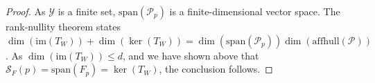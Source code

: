 \documentclass[anon,12pt]{colt2021} %
\newcommand{\Comments}{1}
\newcommand{\mynote}[2]{\ifnum\Comments=1\textcolor{#1}{#2}\fi}
\newcommand{\mytodo}[2]{\ifnum\Comments=1%
	\todo[linecolor=#1!80!black,backgroundcolor=#1,bordercolor=#1!80!black]{#2}\fi}
\newcommand{\raft}[1]{\mytodo{green!20!white}{RF: #1}}
\newcommand{\jessie}[1]{\mynote{purple}{[JF: #1]}}
\newcommand{\relint}[1]{\mathrm{relint}(#1)}
\newcommand{\spn}{\mathrm{span}}
\newcommand{\affhull}{\mathrm{affhull}}
\newcommand{\E}{\mathbb{E}}
\renewcommand{\L}{\mathcal{L}}
\newcommand{\R}{\mathcal{R}}
\renewcommand{\P}{\mathcal{P}}
\newcommand{\Sc}{\mathcal{S}}  %
\newcommand{\Scr}{\mathcal{S}}  %
\newcommand{\Y}{\mathcal{Y}}
\newcommand{\im}{\mathrm{im}}
\newcommand{\toto}{\rightrightarrows}
\begin{document}
\begin{proof}
  As $\Y$ is a finite set, $\spn(\P_p)$ is a finite-dimensional vector space.
  The rank-nullity theorem states $\dim(\im(T_W)) + \dim(\ker(T_W)) = \dim(\spn(\P_p)) \dim(\affhull(\P))$.
  As $\dim(\im(T_W)) \leq d$, and we have shown above that $\Scr_F(p) = \spn(F_p) = \ker(T_W)$, the conclusion follows.
\end{proof}

\end{document}
